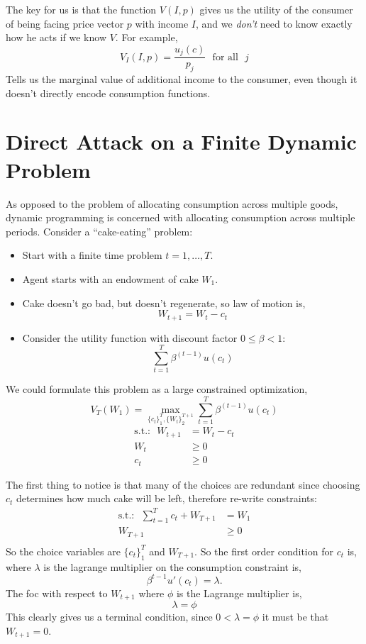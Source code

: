 \documentclass[twoside]{article}
\begin{document}
The key for us is that the function $V(I, p)$ gives us the utility of the consumer of being facing price vector $p$ 
with income $I$, and we {\it don't} need to know exactly how he acts if we know $V$. For example,
$$ V_I(I, p) =  \frac{u_j(c)}{p_j} \mbox{~~for all ~} j $$
Tells us the marginal value of additional income to the consumer, even though it doesn't directly encode consumption functions.

\section{Direct Attack on a Finite Dynamic Problem}
As opposed to the problem of allocating consumption across multiple goods, dynamic programming is concerned with allocating consumption
across multiple periods.  Consider a ``cake-eating'' problem:
 \begin{itemize}
  \item Start with a finite time problem $t = 1,\ldots, T$.
 \item Agent starts with an endowment of cake $W_1$. 
 \item Cake doesn't go bad, but doesn't regenerate, so law of motion is, 
 $$ W_{t+1} = W_t - c_t$$
 \item Consider the utility function with discount factor $0 \leq \beta < 1$: 
 $$ \sum_{t=1}^T \beta^{(t-1)} u(c_t) $$
 \end{itemize}


We could formulate this problem as a large constrained optimization,
$$V_T(W_1) = \max_{\{c_t\}_1^T, \{W_t\}_2^{T+1}} \sum_{t=1}^T \beta^{(t-1)} u(c_t) $$ 
\begin{align*}
\mbox{s.t.:~~} W_{t+1} &= W_t - c_t \\
 W_t &\geq 0 \\
 c_t & \geq 0 
 \end{align*}
 
 The first thing to notice is that many of the choices are redundant since choosing $c_t$ determines how much cake will be left, therefore re-write constraints: 
\begin{align*}
\mbox{s.t.:~~} \sum_{t=1}^T c_t + W_{T+1} &= W_1 \\
 W_{T+1} &\geq 0 \\
 \end{align*}
 So the choice variables are $\{c_t\}_1^T$ and $W_{T+1}$.  So the first order condition for $c_t$ is, where $\lambda$ is the lagrange multiplier on the consumption constraint is, 
 $$\beta^{t-1} u'(c_t) = \lambda.$$ 
The foc with respect to $W_{t+1}$ where $\phi$ is the Lagrange multiplier is, 
$$\lambda = \phi$$
This clearly gives us a terminal condition, since $0 < \lambda = \phi$ it must be that $W_{t+1} = 0$. 
\end{document}
